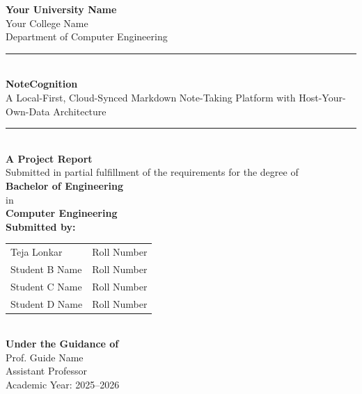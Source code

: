 \documentclass[12pt, a4paper, oneside]{report}
\newcommand{\projecttitle}{NoteCognition}
\newcommand{\projectsubtitle}{A Local-First, Cloud-Synced Markdown Note-Taking Platform with Host-Your-Own-Data Architecture}
\newcommand{\collegename}{Your College Name}               %
\newcommand{\universityname}{Your University Name}         %
\newcommand{\departmentname}{Department of Computer Engineering} %
\newcommand{\academicyear}{2025--2026}                     %
\newcommand{\guidename}{Prof. Guide Name}                  %
\newcommand{\guidetitle}{Assistant Professor}               %
\newcommand{\studentA}{Teja Lonkar}                        %
\newcommand{\rollA}{Roll Number}                           %
\newcommand{\studentB}{Student B Name}                     %
\newcommand{\rollB}{Roll Number}                           %
\newcommand{\studentC}{Student C Name}                     %
\newcommand{\rollC}{Roll Number}                           %
\newcommand{\studentD}{Student D Name}                     %
\newcommand{\rollD}{Roll Number}                           %
\begin{document}

\begin{titlepage}
    \centering
    \vspace*{0.5cm}


    {\large \textbf{\universityname}}\\[0.3cm]
    {\large \collegename}\\[0.3cm]
    {\large \departmentname}\\[1.5cm]

    \rule{\linewidth}{0.5pt}\\[0.4cm]
    {\Huge \textbf{\projecttitle}}\\[0.3cm]
    {\large \projectsubtitle}\\[0.2cm]
    \rule{\linewidth}{0.5pt}\\[1.5cm]

    {\large \textbf{A Project Report}}\\[0.3cm]
    {\large Submitted in partial fulfillment of the requirements for the degree of}\\[0.3cm]
    {\large \textbf{Bachelor of Engineering}}\\[0.3cm]
    {\large in}\\[0.3cm]
    {\large \textbf{Computer Engineering}}\\[1.5cm]

    {\large \textbf{Submitted by:}}\\[0.4cm]
    \begin{tabular}{ll}
        \studentA & \rollA \\
        \studentB & \rollB \\
        \studentC & \rollC \\
        \studentD & \rollD \\
    \end{tabular}\\[1.5cm]

    {\large \textbf{Under the Guidance of}}\\[0.3cm]
    {\large \guidename}\\[0.1cm]
    {\large \guidetitle}\\[1.5cm]

    {\large Academic Year: \academicyear}

    \vfill
\end{titlepage}
\end{document}
